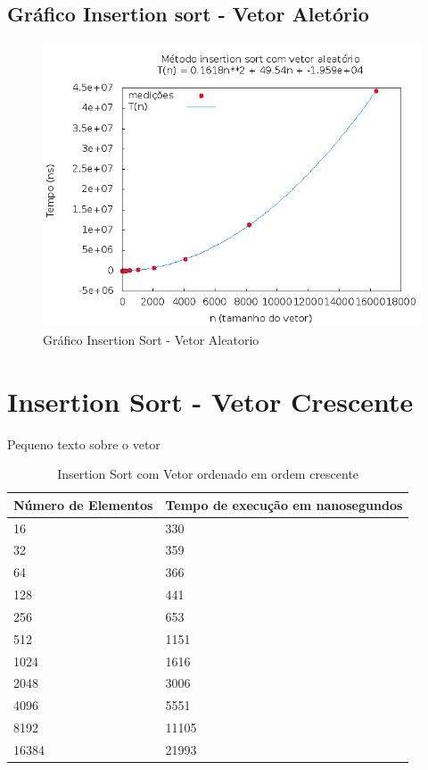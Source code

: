 \documentclass[12pt,a4paper,twoside]{report}
\begin{document}
\subsection{Gráfico Insertion sort - Vetor Aletório}
\begin{figure}[H]
    \centering
    \includegraphics[width=0.7\linewidth]{graficos/Insertion/vIntAleatorio/vIntAleatorio.png}
  \caption{Gráfico Insertion Sort - Vetor Aleatorio}
\end{figure}


\section{Insertion Sort - Vetor Crescente}
Pequeno texto sobre o vetor

\begin{table}[H]
\centering
\caption{Insertion Sort com Vetor ordenado em ordem crescente}
\label{my-label}
\begin{tabular}{|l|l|}
\hline
\multicolumn{1}{|c|}{\textbf{Número de Elementos}} & \multicolumn{1}{c|}{\textbf{Tempo de execução em nanosegundos}} \\ \hline
16 & 330 \\ \hline
32 & 359 \\ \hline
64 & 366 \\ \hline
128 & 441 \\ \hline
256 & 653 \\ \hline
512 & 1151 \\ \hline
1024 & 1616 \\ \hline
2048 & 3006 \\ \hline
4096 & 5551 \\ \hline
8192 & 11105 \\ \hline
16384 & 21993 \\ \hline
\end{tabular}
\end{table}
\end{document}
